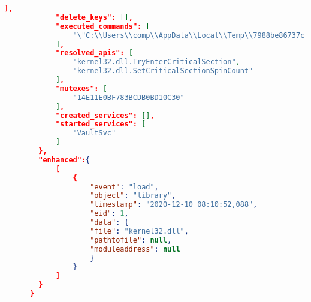 \begin{lstlisting}[language=json, caption={Example of \emph{behavior} part entries in \emph{report.json} - only examples of entries},captionpos=b, label={lst:report_example}]
            ],
            "delete_keys": [],
            "executed_commands": [
                "\"C:\\Users\\comp\\AppData\\Local\\Temp\\7988be86737cfdcc6f6a.exe\""
            ],
            "resolved_apis": [
                "kernel32.dll.TryEnterCriticalSection",
                "kernel32.dll.SetCriticalSectionSpinCount"
            ],
            "mutexes": [
                "14E11E0BF783BCDB0BD10C30"
            ],
            "created_services": [],
            "started_services": [
                "VaultSvc"
            ]
        },
        "enhanced":{
            [
                {
                    "event": "load",
                    "object": "library",
                    "timestamp": "2020-12-10 08:10:52,088",
                    "eid": 1,
                    "data": {
                    "file": "kernel32.dll",
                    "pathtofile": null,
                    "moduleaddress": null
                    }
                }
            ]
        }  
      }
    
  \end{lstlisting}